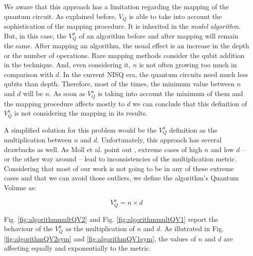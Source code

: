 \documentclass[11pt]{article}
\begin{document}
We aware that this approach has a limitation regarding the mapping of the quantum circuit.
As explained before, \(V_Q\) is able to take into account the sophistication of the mapping procedure.
It is inherited in the \emph{model algorithm}.
But, in this case, the \(V^a_Q\) of an algorithm before and after mapping will remain the same.
After mapping an algorithm, the usual effect is an increase in the depth or the number of operations.
Rare mapping methods consider the qubit addition in the technique.
And, even considering it, \(n\) is not often growing too much in comparison with \(d\).
In the current NISQ era, the quantum circuits need much less qubits than depth.
Therefore, most of the times, the minimum value between \(n\) and \(d\) will be \(n\).
As soon as \(V^a_Q\) is taking into account the minimum of them and the mapping procedure affects mostly to \(d\) we can conclude that this definition of \(V^a_Q\) is not considering the mapping in its results.

A simplified solution for this problem would be the \(V^a_Q\) definition as the multiplication between \(n\) and \(d\).
Unfortunately, this approach has several drawbacks as well.
As Moll et al. point out \cite{Moll_2018}, extreme cases of high \(n\) and low \(d\) -- or the other way around -- lead to inconsistencies of the multiplication metric.
Considering that most of our work is not going to be in any of these extreme cases and that we can avoid those outliers, we define the algorithm's Quantum Volume as:

$$V_Q^a =  n \times d$$

Fig. \ref{fig:algorithmmultQV2} and Fig. \ref{fig:algorithmmultQV1} report the behaviour of the \(V_Q^a\) as
the multiplication of \(n\) and \(d\).
As illutrated in Fig. \ref{fig:algorithmQV2sym} and \ref{fig:algorithmQV1sym}, the values of \(n\) and \(d\) are
affecting equally and exponentially to the metric.

\end{document}
